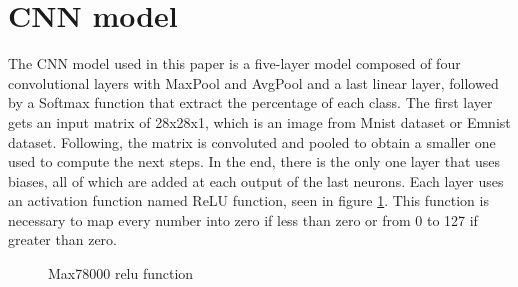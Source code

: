\section{CNN model}
\label{sec:457}
\quad The CNN model used in this paper is a five-layer model composed of four convolutional layers with MaxPool and AvgPool and a last linear layer, followed by a Softmax function that extract the percentage of each class. 
The first layer gets an input matrix of 28x28x1, which is an image from Mnist dataset or Emnist dataset. Following, the matrix is convoluted and pooled to obtain a smaller one used to compute the next steps. 
In the end, there is the only one layer that uses biases, all of which are added at each output of the last neurons. 
Each layer uses an activation function named ReLU function, seen in figure \ref{relu}. This function is necessary to map every number into zero if less than zero or from 0 to 127 if greater than zero.

\begin{figure}[!ht]
\centerline{}
\caption{Max78000 relu function}
\label{relu}
\end{figure}

\clearpage
\newpage
\mbox{~}
\clearpage
\newpage